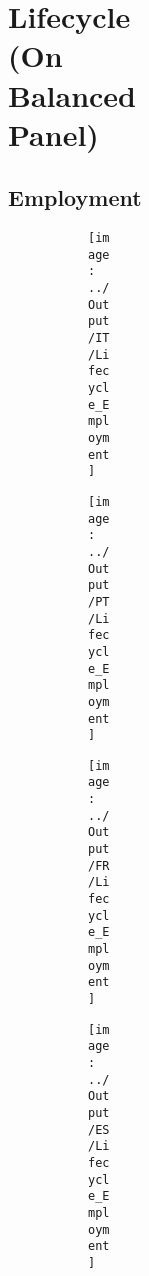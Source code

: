\documentclass[12pt,notitlepage]{article}
\begin{document}
\begin{figure}[!htpb]
\begin{subfigure}{.49\textwidth}
\begin{figure}[!htpb]
\begin{subfigure}{.49\textwidth}
\FloatBarrier
\section{Lifecycle (On Balanced Panel)} %
\label{sec:lifecycle}
\FloatBarrier

\subsection{Employment} %
\label{sec:employment}


\begin{figure}[!htpb]
\centering
\caption{Average Employment by Year (Orbis)}
\begin{subfigure}{.49\textwidth}
    \centering
 \texttt{[image: ../Output/IT/Lifecycle\_Employment]}
\end{subfigure}%
\begin{subfigure}{.49\textwidth}
    \centering
 \texttt{[image: ../Output/PT/Lifecycle\_Employment]}
\end{subfigure}
\begin{subfigure}{.49\textwidth}
    \centering
 \texttt{[image: ../Output/FR/Lifecycle\_Employment]}
\end{subfigure}%
\begin{subfigure}{.49\textwidth}
    \centering
 \texttt{[image: ../Output/ES/Lifecycle\_Employment]}
\end{subfigure}
\end{figure}
\pagebreak




\end{subfigure}
\end{figure}
\end{subfigure}
\end{figure}
\end{document}
